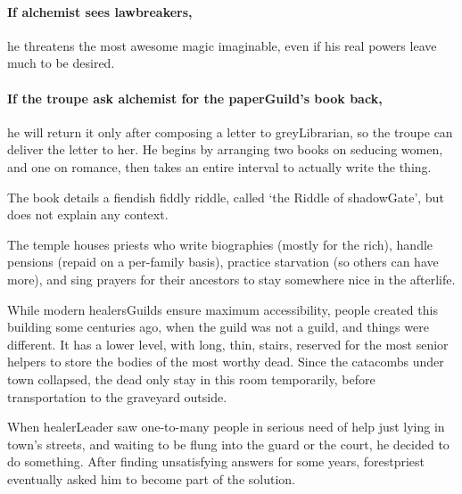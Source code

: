 \begin{multicols}{2}
\citadelAlchemist
\label{citadel_alchemist}

\showStdSpells

\paragraph{If \gls{alchemist} sees lawbreakers,}
he threatens the most awesome magic imaginable, even if his real powers leave much to be desired.

\paragraph{If the troupe ask \gls{alchemist} for the \gls{paperGuild}'s book back,}
he will return it only after composing a letter to \gls{greyLibrarian}, so the troupe can deliver the letter to her.
He begins by arranging two books on seducing women, and one on romance, then takes an entire \gls{interval} to actually write the thing. 

The book details a fiendish fiddly riddle, called `the Riddle of \gls{shadowGate}', but does not explain any context.


\label{hardestRiddle}
\hardestRiddleEver



The temple houses priests who write biographies (mostly for the rich), handle pensions (repaid on a per-family basis), practice starvation (so others can have more), and sing prayers for their ancestors to stay somewhere nice in the afterlife.

While modern \glspl{healersGuild} ensure maximum accessibility, people created this building some centuries ago, when the guild was not a guild, and things were different.
It has a lower level, with long, thin, stairs, reserved for the most senior \glspl{helper} to store the bodies of the most worthy dead.
Since the catacombs under \gls{town} collapsed, the dead only stay in this room temporarily, before transportation to the graveyard outside.

\begin{exampletext}
  When \gls{healerLeader} saw one-to-many people in serious need of help just lying in \gls{town}'s streets, and waiting to be flung into the \gls{guard} or the \gls{court}, he decided to do something.
  After finding unsatisfying answers for some years, \gls{forestpriest} eventually asked him to become part of the solution.


\end{exampletext}
\end{multicols}
